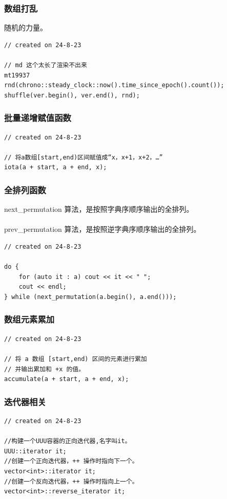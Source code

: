 \documentclass[a4paper,12pt]{article}
\begin{document}
\subsubsection{数组打乱}
\noindent 随机的力量。
\begin{lstlisting}
// created on 24-8-23

// md 这个太长了渲染不出来
mt19937 
rnd(chrono::steady_clock::now().time_since_epoch().count());
shuffle(ver.begin(), ver.end(), rnd);
\end{lstlisting}

\subsubsection{批量递增赋值函数}
\begin{lstlisting}
// created on 24-8-23

// 将a数组[start,end)区间赋值成“x，x+1，x+2，…”
iota(a + start, a + end, x);
\end{lstlisting}

\subsubsection{全排列函数}
\noindent next\_permutation 算法，是按照字典序顺序输出的全排列。\\ \\
\noindent prev\_permutation 算法，是按照逆字典序顺序输出的全排列。\\
\begin{lstlisting}
// created on 24-8-23

do {
    for (auto it : a) cout << it << " ";
    cout << endl;
} while (next_permutation(a.begin(), a.end()));
\end{lstlisting}

\subsubsection{数组元素累加}
\begin{lstlisting}
// created on 24-8-23

// 将 a 数组 [start,end) 区间的元素进行累加
// 并输出累加和 +x 的值。
accumulate(a + start, a + end, x);
\end{lstlisting}

\subsubsection{迭代器相关}
\begin{lstlisting}
// created on 24-8-23

//构建一个UUU容器的正向迭代器,名字叫it。
UUU::iterator it; 
//创建一个正向迭代器，++ 操作时指向下一个。
vector<int>::iterator it; 
//创建一个反向迭代器，++ 操作时指向上一个。
vector<int>::reverse_iterator it; 
\end{lstlisting}
\end{document}
